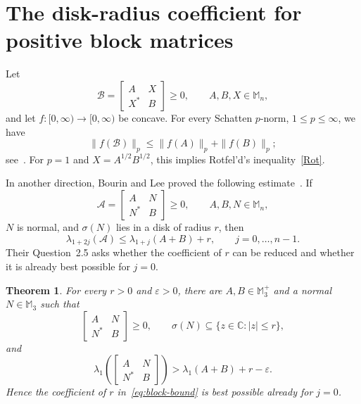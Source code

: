 \documentclass[10pt,a4paper]{amsart}
\numberwithin{equation}{section}
\newtheorem{theorem}{Theorem}[section]
\newcommand{\Mn}{\mathbb M_n}
\newcommand{\spec}{\sigma}
\begin{document}
\section{The disk-radius coefficient for positive block matrices}
\label{sec:block}

Let
\[
\mathcal B=\begin{bmatrix}A&X\\X^*&B\end{bmatrix}\geq0,
\qquad A,B,X\in\Mn,
\]
and let $f:[0,\infty)\to[0,\infty)$ be concave.
For every Schatten $p$-norm, $1\leq p\leq\infty$, we have
\[
\|f(\mathcal B)\|_p\leq\|f(A)\|_p+\|f(B)\|_p;
\]
see~\cite[Corollary~3.5]{BL12}.
For $p=1$ and $X=A^{1/2}B^{1/2}$, this implies
Rotfel'd's inequality~\eqref{Rot}. 

\begingroup

In another direction,
\endgroup
Bourin and Lee proved the following estimate~\cite[Corollary~2.4]{BourinLee2022}. If
\[
 \mathcal A=\begin{bmatrix}A&N\\N^*&B\end{bmatrix}\geq0,
 \qquad A,B,N\in\Mn,
\]
$N$ is normal, and $\spec(N)$ lies in a disk of radius $r$, then
\begin{equation}\label{eq:block-bound}
 \lambda_{1+2j}(\mathcal A)
 \leq\lambda_{1+j}(A+B)+r,
 \qquad j=0,\ldots,n-1.
\end{equation}
Their Question~2.5 asks whether the coefficient of $r$ can be reduced and whether it is already best possible for $j=0$.


\begin{theorem}\label{thm:radius-sharp}
For every $r>0$ and $\varepsilon>0$, there are $A,B\in\mathbb M_3^+$ and a normal $N\in\mathbb M_3$ such that
\[
 \begin{bmatrix}A&N\\N^*&B\end{bmatrix}\geq0,
 \qquad
 \spec(N)\subseteq\{z\in\mathbb C:|z|\leq r\},
\]
and
\begin{equation}\label{eq:radius-sharp}
 \lambda_1\!\left(\begin{bmatrix}A&N\\N^*&B\end{bmatrix}\right)
 >\lambda_1(A+B)+r-\varepsilon.
\end{equation}
Hence the coefficient of $r$ in~\eqref{eq:block-bound} is best possible already for $j=0$.
\end{theorem}
\end{document}
